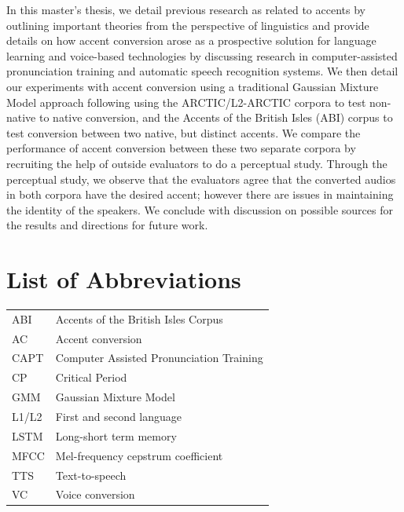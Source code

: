 \documentclass
[
    a4paper,
    twoside,
    12pt,
]
{report}
\begin{document}
In this master's thesis, we detail previous research as related to
accents by outlining important theories from the perspective of
linguistics and provide details on how accent conversion arose as a
prospective solution for language learning and voice-based technologies
by discussing research in computer-assisted pronunciation training and
automatic speech recognition systems. We then detail our experiments
with accent conversion using a traditional Gaussian Mixture Model
approach following \textcite{aryal2014} using the ARCTIC/L2-ARCTIC
corpora to test non-native to native conversion, and the Accents of the
British Isles (ABI) corpus to test conversion between two native, but
distinct accents. We compare the performance of accent conversion
between these two separate corpora by recruiting the help of outside
evaluators to do a perceptual study. Through the perceptual study, we
observe that the evaluators agree that the converted audios in both
corpora have the desired accent; however there are issues in maintaining
the identity of the speakers. We conclude with discussion on possible
sources for the results and directions for future work.
\cleardoublepage
\tableofcontents
{}
\clearpage
\listoffigures
{}

\cleardoublepage
\section*{List of Abbreviations}
\begin{tabular}{ll}
    ABI   & Accents of the British Isles Corpus \\
    AC    & Accent conversion \\
    CAPT    & Computer Assisted Pronunciation Training \\
    CP      & Critical Period \\
    GMM     & Gaussian Mixture Model \\
    L1/L2    & First and second language \\
    LSTM & Long-short term memory \\
    MFCC & Mel-frequency cepstrum coefficient \\ 
    TTS   & Text-to-speech \\
    VC   & Voice conversion \\
    
\end{tabular}
\end{document}
